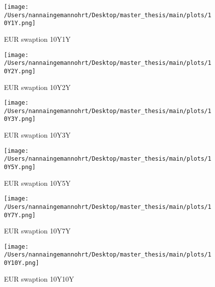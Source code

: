 \begin{figure}[H]
    \centering
    \begin{minipage}{0.5\textwidth}
        \texttt{[image: /Users/nannaingemannohrt/Desktop/master\_thesis/main/plots/10Y1Y.png]}
        \caption{EUR swaption 10Y1Y}
        \label{fig:10Y1Y}
    \end{minipage}\hfill 
    \begin{minipage}{0.5\textwidth}
        \texttt{[image: /Users/nannaingemannohrt/Desktop/master\_thesis/main/plots/10Y2Y.png]}
        \caption{EUR swaption 10Y2Y}
        \label{fig:10Y2Y}
    \end{minipage}

    \centering
    \begin{minipage}{0.5\textwidth}
        \texttt{[image: /Users/nannaingemannohrt/Desktop/master\_thesis/main/plots/10Y3Y.png]}
        \caption{EUR swaption 10Y3Y}
        \label{fig:10Y3Y}
    \end{minipage}\hfill 
    \begin{minipage}{0.5\textwidth}
        \texttt{[image: /Users/nannaingemannohrt/Desktop/master\_thesis/main/plots/10Y5Y.png]}
        \caption{EUR swaption 10Y5Y}
        \label{fig:10Y5Y}
    \end{minipage}

    \centering
    \begin{minipage}{0.5\textwidth}
        \texttt{[image: /Users/nannaingemannohrt/Desktop/master\_thesis/main/plots/10Y7Y.png]}
        \caption{EUR swaption 10Y7Y}
        \label{fig:10Y7Y}
    \end{minipage}\hfill 
    \begin{minipage}{0.5\textwidth}
        \texttt{[image: /Users/nannaingemannohrt/Desktop/master\_thesis/main/plots/10Y10Y.png]}
        \caption{EUR swaption 10Y10Y}
        \label{fig:10Y10Y}
    \end{minipage}    
\end{figure}

